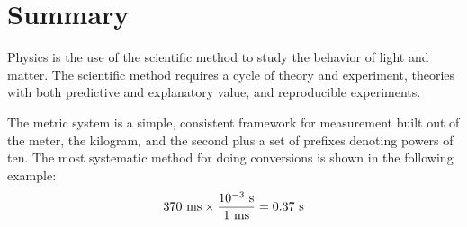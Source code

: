 












\section{Summary}

 Physics is the use of the scientific method to study the
 behavior of light and matter. The scientific method requires
 a cycle of theory and experiment, theories with both
 predictive and explanatory value, and reproducible experiments.

 The metric system is a simple, consistent framework for
 measurement built out of the meter, the kilogram, and the
 second plus a set of prefixes denoting powers of ten. The
 most systematic method for doing conversions is shown in
 the following example:
 \begin{equation*}
   370\ \zu{ms} \times \frac{10^{-3}\ \sunit}{1\ \zu{ms}} = 0.37\ \sunit
 \end{equation*}

